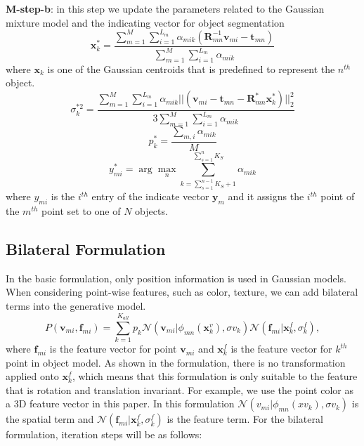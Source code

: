 \textbf{M-step-b}: in this step we update the parameters related to the Gaussian mixture model and the indicating vector for object segmentation 
\begin{equation}
\label{equ:updatexk}
\mathbf x_k^*=\frac{\sum_{m=1}^M\sum_{i=1}^{L_m}\alpha_{mik}(\mathbf{R}_{mn}^{-1}\mathbf{v}_{mi}-\mathbf t_{mn})}{\sum_{m=1}^M\sum_{i=1}^{L_m}\alpha_{mik}}
\end{equation}
where $\mathbf{x}_k$ is one of the Gaussian centroids that is predefined to represent the $n^{th}$ object. 
\begin{equation}
\label{equ:updatesigma}
\sigma_k^{*2}=\frac{\sum_{m=1}^M\sum_{i=1}^{L_m}\alpha_{mik}||(\mathbf{v}_{mi}-\mathbf t_{mn}-\mathbf{R}_{mn}^*\mathbf x_k^*)||_2^2}{3\sum_{m=1}^M\sum_{i=1}^{L_m}\alpha_{mik}}
\end{equation}
\begin{equation}
\label{equ:updatepk}
p_k^*=\frac{\sum_{m,i}\alpha_{mik}}{M}
\end{equation}
\begin{equation}
\label{equ:updatey}
y_{mi}^*=\arg \max_n \sum_{k=\sum_{s=1}^{n-1}K_S+1}^{\sum_{s=1}^{n}K_S} \alpha_{mik} 
\end{equation}
where $y_{mi}$ is the $i^{th}$ entry of the indicate vector $\mathbf{y}_{m}$ and it assigns the $i^{th}$ point of the $m^{th}$ point set to one of $N$ objects.  

\subsection{Bilateral Formulation}
\label{sec:bilateral-formulation}

In the basic formulation, only position information is used in Gaussian models.
When considering point-wise features, such as color, texture, we can add bilateral terms into the generative model.
\begin{equation}
P(\mathbf{v}_{mi},\mathbf{f}_{mi})=\sum^{K_{all}}_{k=1}p_k\mathcal{N}(\mathbf{v}_{mi}|\phi_{mn}(\mathbf{x}^v_k),\sigma v_k)\mathcal{N}(\mathbf{f}_{mi}|\mathbf{x}^f_k,\sigma^f_k),
\end{equation}
where $\mathbf{f}_{mi}$ is the feature vector for point $\mathbf{v}_{mi}$ and $\mathbf{x}_k^f$ is the feature vector for $k^{th}$ point in object model. As shown in the formulation, there is no transformation applied onto $\mathbf{x}_k^f$, which means that this formulation is only suitable to the feature that is rotation and translation invariant. 
For example, we use the point color as a 3D feature vector in this paper. 
In this formulation $\mathcal{N}(v_{mi}|\phi_{mn}(xv_k),\sigma v_k)$ is the spatial term and $\mathcal{N}(\mathbf{f}_{mi}|\mathbf{x}^f_k,\sigma^f_k)$ is the feature term.
For the bilateral formulation, iteration steps will be as follows:

